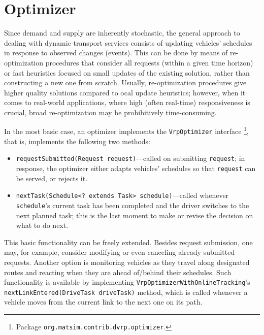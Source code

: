 \section{Optimizer}
\label{sec:VRP-optimizer}
Since demand and supply are inherently stochastic, the general approach to dealing with dynamic transport services consists of updating vehicles' schedules in response to observed changes (\ie events). This can be done by means of re-optimization procedures that consider all requests (within a given time horizon) or fast heuristics focused on small updates of the existing solution, rather than constructing a new one from scratch. Usually, re-optimization procedures give higher quality  solutions compared to ocal update heuristics; however, when it comes to real-world applications, where high (often real-time) responsiveness is crucial, broad re-optimization may be prohibitively time-consuming.

In the most basic case, an optimizer implements the \lstinline$VrpOptimizer$ interface%
\footnote{
Package \lstinline$org.matsim.contrib.dvrp.optimizer$.
},
that is, implements the following two methods:
%
\begin{itemize}\styleItemize
	\item \lstinline$requestSubmitted(Request request)$---called on submitting \lstinline$request$; in response, the optimizer either adapts vehicles' schedules so that \lstinline$request$ can be served, or rejects it.
	
	\item \lstinline$nextTask(Schedule<? extends Task> schedule)$---called whenever \lstinline$schedule$'s current task has been completed and the driver switches to the next planned task; this is the last moment to make or revise the decision on what to do next.

\end{itemize}

This basic functionality can be freely extended. Besides request submission, one may, for example, consider modifying or even canceling already submitted requests. Another option is monitoring vehicles as they travel along designated routes and reacting when they are ahead of/behind their schedules. Such functionality is available by implementing \lstinline$VrpOptimizerWithOnlineTracking$'s \lstinline$nextLinkEntered(DriveTask driveTask)$ method, which is called whenever a vehicle moves from the current link to the next one on its path.

